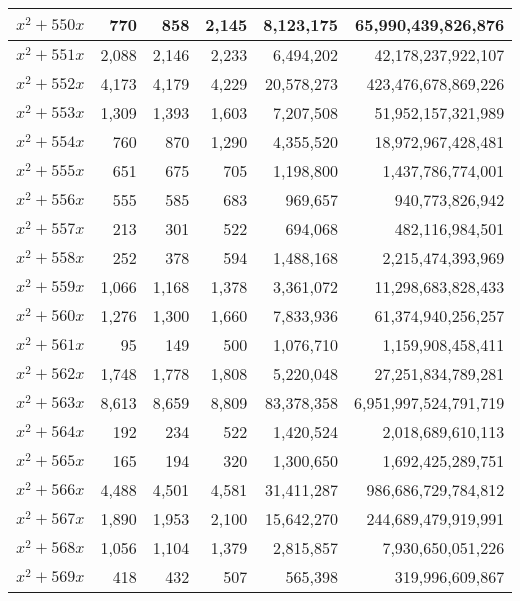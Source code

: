 \documentclass{article}
\begin{document}
\begin{center}
\begin{tabular}{ | c | r | r | r | r | r | }
$x^2 + 550x$ & 770 & 858 & 2{,}145 & 8{,}123{,}175 & 65{,}990{,}439{,}826{,}876 \\ \hline
$x^2 + 551x$ & 2{,}088 & 2{,}146 & 2{,}233 & 6{,}494{,}202 & 42{,}178{,}237{,}922{,}107 \\ \hline
$x^2 + 552x$ & 4{,}173 & 4{,}179 & 4{,}229 & 20{,}578{,}273 & 423{,}476{,}678{,}869{,}226 \\ \hline
$x^2 + 553x$ & 1{,}309 & 1{,}393 & 1{,}603 & 7{,}207{,}508 & 51{,}952{,}157{,}321{,}989 \\ \hline
$x^2 + 554x$ & 760 & 870 & 1{,}290 & 4{,}355{,}520 & 18{,}972{,}967{,}428{,}481 \\ \hline
$x^2 + 555x$ & 651 & 675 & 705 & 1{,}198{,}800 & 1{,}437{,}786{,}774{,}001 \\ \hline
$x^2 + 556x$ & 555 & 585 & 683 & 969{,}657 & 940{,}773{,}826{,}942 \\ \hline
$x^2 + 557x$ & 213 & 301 & 522 & 694{,}068 & 482{,}116{,}984{,}501 \\ \hline
$x^2 + 558x$ & 252 & 378 & 594 & 1{,}488{,}168 & 2{,}215{,}474{,}393{,}969 \\ \hline
$x^2 + 559x$ & 1{,}066 & 1{,}168 & 1{,}378 & 3{,}361{,}072 & 11{,}298{,}683{,}828{,}433 \\ \hline
$x^2 + 560x$ & 1{,}276 & 1{,}300 & 1{,}660 & 7{,}833{,}936 & 61{,}374{,}940{,}256{,}257 \\ \hline
$x^2 + 561x$ & 95 & 149 & 500 & 1{,}076{,}710 & 1{,}159{,}908{,}458{,}411 \\ \hline
$x^2 + 562x$ & 1{,}748 & 1{,}778 & 1{,}808 & 5{,}220{,}048 & 27{,}251{,}834{,}789{,}281 \\ \hline
$x^2 + 563x$ & 8{,}613 & 8{,}659 & 8{,}809 & 83{,}378{,}358 & 6{,}951{,}997{,}524{,}791{,}719 \\ \hline
$x^2 + 564x$ & 192 & 234 & 522 & 1{,}420{,}524 & 2{,}018{,}689{,}610{,}113 \\ \hline
$x^2 + 565x$ & 165 & 194 & 320 & 1{,}300{,}650 & 1{,}692{,}425{,}289{,}751 \\ \hline
$x^2 + 566x$ & 4{,}488 & 4{,}501 & 4{,}581 & 31{,}411{,}287 & 986{,}686{,}729{,}784{,}812 \\ \hline
$x^2 + 567x$ & 1{,}890 & 1{,}953 & 2{,}100 & 15{,}642{,}270 & 244{,}689{,}479{,}919{,}991 \\ \hline
$x^2 + 568x$ & 1{,}056 & 1{,}104 & 1{,}379 & 2{,}815{,}857 & 7{,}930{,}650{,}051{,}226 \\ \hline
$x^2 + 569x$ & 418 & 432 & 507 & 565{,}398 & 319{,}996{,}609{,}867 \\ \hline

\end{tabular}
\end{center}
\end{document}
